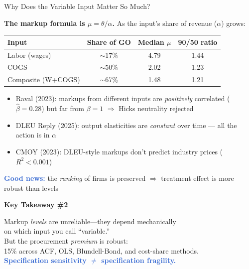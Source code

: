 \documentclass[aspectratio=169,11pt]{beamer}
\newcommand{\highlighttext}[1]{\textcolor{highlight}{\textbf{#1}}}
\begin{document}
\begin{frame}{Why Does the Variable Input Matter So Much?}

\textbf{The markup formula is $\mu = \theta / \alpha$.} As the input's share of revenue ($\alpha$) grows:

\medskip

\begin{center}
\begin{tabular}{lccc}
\toprule
Input & Share of GO & Median $\mu$ & 90/50 ratio \\
\midrule
Labor (wages) & $\sim$17\% & 4.79 & 1.44 \\
COGS & $\sim$50\% & 2.02 & 1.23 \\
Composite (W+COGS) & $\sim$67\% & 1.48 & 1.21 \\
\bottomrule
\end{tabular}
\end{center}

\medskip

\begin{itemize}
    \item Raval (2023): markups from different inputs are \emph{positively} correlated ($\hat{\beta} = 0.28$) but far from $\beta = 1$ $\Rightarrow$ Hicks neutrality rejected
    \item DLEU Reply (2025): output elasticities are \emph{constant} over time --- all the action is in $\alpha$
    \item CMOY (2023): DLEU-style markups don't predict industry prices ($R^2 < 0.001$)
\end{itemize}

\medskip

\highlighttext{Good news:} the \emph{ranking} of firms is preserved $\Rightarrow$ treatment effect is more robust than levels

\end{frame}

\begin{frame}{}
\vfill
\begin{center}
{\Large \textbf{Key Takeaway \#2}}

\bigskip

{\large Markup \emph{levels} are unreliable---they depend mechanically\\
on which input you call ``variable.''\\[0.3cm]
But the procurement \emph{premium} is robust:\\
15\% across ACF, OLS, Blundell-Bond, and cost-share methods.\\[0.3cm]
\highlighttext{Specification sensitivity $\neq$ specification fragility.}}
\end{center}
\vfill
\end{frame}
\end{document}

